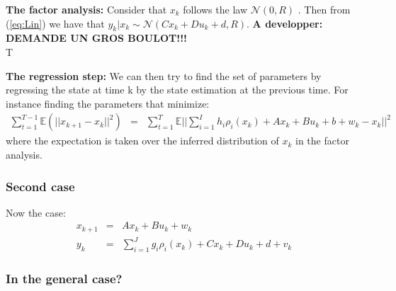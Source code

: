 \textbf{The factor analysis:} Consider that $x_k$ follows the law $\mathcal{N}(0,R)$ . Then from (\ref{eq:Lin}) we have that $y_k|x_k\sim\mathcal{N}(Cx_k+Du_k+d,R)$.  \textbf{A developper: DEMANDE UN GROS BOULOT!!!}\\
T

\textbf{The regression step:} We can then try to find the set of parameters by regressing the state at time k by the state estimation at the previous time. For instance finding the parameters that minimize:
\begin{eqnarray}
\sum_{t=1}^{T-1}{\mathbb{E}(||x_{k+1}-x_k||^2)}&=&\sum_{t=1}^T{\mathbb{E}||\sum_{i=1}^{I}{h_i\rho_i(x_k)}+Ax_k+Bu_k+b+w_k-x_k||^2}
\end{eqnarray}
where the expectation is taken over the inferred distribution of $x_k$ in the factor analysis.

\subsubsection{Second case}
Now the case:
\begin{eqnarray}
x_{k+1} &=& Ax_k+Bu_k+w_k\\
y_{k} &=& \sum_{i=1}^{J}{g_i\rho_i(x_k)}+Cx_k+Du_k+d+v_k
\end{eqnarray}

\subsubsection{In the general case?}
